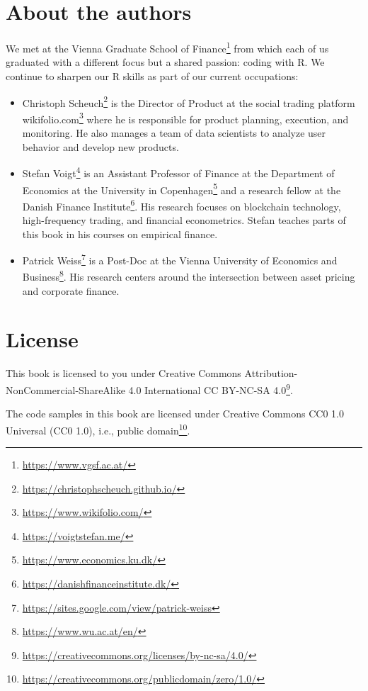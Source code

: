 \documentclass[
]{krantz}
\providecommand{\tightlist}{%
  \setlength{\itemsep}{0pt}\setlength{\parskip}{0pt}}
\renewcommand{\href}[2]{#2\footnote{\url{#1}}}
\begin{document}
\hypertarget{about-the-authors}{%
\section*{About the authors}\label{about-the-authors}}


We met at the \href{https://www.vgsf.ac.at/}{Vienna Graduate School of Finance} from which each of us graduated with a different focus but a shared passion: coding with R. We continue to sharpen our R skills as part of our current occupations:

\begin{itemize}
\tightlist
\item
  \href{https://christophscheuch.github.io/}{Christoph Scheuch} is the Director of Product at the social trading platform \href{https://www.wikifolio.com/}{wikifolio.com} where he is responsible for product planning, execution, and monitoring. He also manages a team of data scientists to analyze user behavior and develop new products.
\item
  \href{https://voigtstefan.me/}{Stefan Voigt} is an Assistant Professor of Finance at the \href{https://www.economics.ku.dk/}{Department of Economics at the University in Copenhagen} and a research fellow at the \href{https://danishfinanceinstitute.dk/}{Danish Finance Institute}. His research focuses on blockchain technology, high-frequency trading, and financial econometrics. Stefan teaches parts of this book in his courses on empirical finance.
\item
  \href{https://sites.google.com/view/patrick-weiss}{Patrick Weiss} is a Post-Doc at the \href{https://www.wu.ac.at/en/}{Vienna University of Economics and Business}. His research centers around the intersection between asset pricing and corporate finance.
\end{itemize}

\hypertarget{license}{%
\section*{License}\label{license}}


This book is licensed to you under \href{https://creativecommons.org/licenses/by-nc-sa/4.0/}{Creative Commons Attribution-NonCommercial-ShareAlike 4.0 International CC BY-NC-SA 4.0}.

The code samples in this book are licensed under \href{https://creativecommons.org/publicdomain/zero/1.0/}{Creative Commons CC0 1.0 Universal (CC0 1.0), i.e., public domain}.
\end{document}
